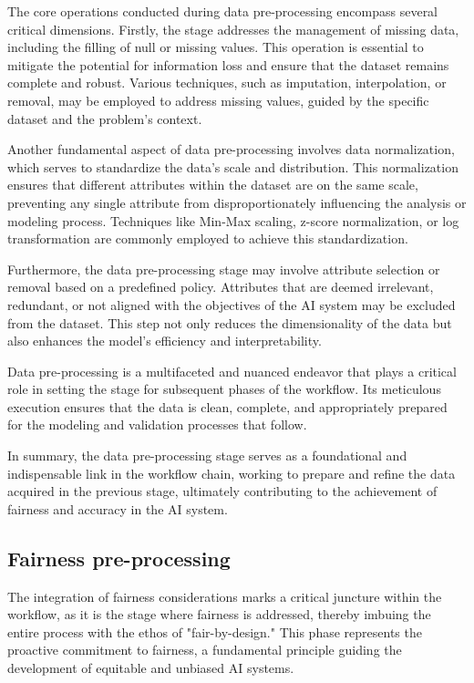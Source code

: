 \documentclass[12pt,a4paper,openright,twoside]{book}
\begin{document}
The core operations conducted during data pre-processing encompass several critical dimensions. Firstly, the stage addresses the management of missing data, including the filling of null or missing values. This operation is essential to mitigate the potential for information loss and ensure that the dataset remains complete and robust. Various techniques, such as imputation, interpolation, or removal, may be employed to address missing values, guided by the specific dataset and the problem's context. 

Another fundamental aspect of data pre-processing involves data normalization, which serves to standardize the data's scale and distribution. This normalization ensures that different attributes within the dataset are on the same scale, preventing any single attribute from disproportionately influencing the analysis or modeling process. Techniques like Min-Max scaling, z-score normalization, or log transformation are commonly employed to achieve this standardization. 

Furthermore, the data pre-processing stage may involve attribute selection or removal based on a predefined policy. Attributes that are deemed irrelevant, redundant, or not aligned with the objectives of the AI system may be excluded from the dataset. This step not only reduces the dimensionality of the data but also enhances the model's efficiency and interpretability. 

Data pre-processing is a multifaceted and nuanced endeavor that plays a critical role in setting the stage for subsequent phases of the workflow. Its meticulous execution ensures that the data is clean, complete, and appropriately prepared for the modeling and validation processes that follow. 

In summary, the data pre-processing stage serves as a foundational and indispensable link in the workflow chain, working to prepare and refine the data acquired in the previous stage, ultimately contributing to the achievement of fairness and accuracy in the AI system.

\subsection{Fairness pre-processing}
The integration of fairness considerations marks a critical juncture within the workflow, as it is the stage where fairness is addressed, thereby imbuing the entire process with the ethos of "fair-by-design." This phase represents the proactive commitment to fairness, a fundamental principle guiding the development of equitable and unbiased AI systems. 
\end{document}
